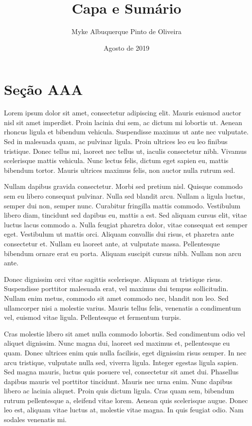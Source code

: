 \documentclass{article}
\begin{document}
	\title{\textbf{{\Huge Capa e Sumário}}}
	\author{Myke Albuquerque Pinto de Oliveira}
	\date{Agosto de 2019}
	
	\maketitle
	\thispagestyle{empty}
	\newpage
	
	\setcounter{page}{1}
	\tableofcontents
	\newpage
	
	\setcounter{page}{1}
	\section{Seção AAA}
	Lorem ipsum dolor sit amet, consectetur adipiscing elit. Mauris euismod auctor nisl sit amet imperdiet. Proin lacinia dui sem, ac dictum mi lobortis ut. Aenean rhoncus ligula et bibendum vehicula. Suspendisse maximus ut ante nec vulputate. Sed in malesuada quam, ac pulvinar ligula. Proin ultrices leo eu leo finibus tristique. Donec tellus mi, laoreet nec tellus ut, iaculis consectetur nibh. Vivamus scelerisque mattis vehicula. Nunc lectus felis, dictum eget sapien eu, mattis bibendum tortor. Mauris ultrices maximus felis, non auctor nulla rutrum sed.
	
	Nullam dapibus gravida consectetur. Morbi sed pretium nisl. Quisque commodo sem eu libero consequat pulvinar. Nulla sed blandit arcu. Nullam a ligula luctus, semper dui non, semper nunc. Curabitur fringilla mattis commodo. Vestibulum libero diam, tincidunt sed dapibus eu, mattis a est. Sed aliquam cursus elit, vitae luctus lacus commodo a. Nulla feugiat pharetra dolor, vitae consequat est semper eget. Vestibulum ut mattis orci. Aliquam convallis dui risus, et pharetra ante consectetur et. Nullam eu laoreet ante, at vulputate massa. Pellentesque bibendum ornare erat eu porta. Aliquam suscipit cursus nibh. Nullam non arcu ante.
	
	Donec dignissim orci vitae sagittis scelerisque. Aliquam at tristique risus. Suspendisse porttitor malesuada erat, vel maximus dui tempus sollicitudin. Nullam enim metus, commodo sit amet commodo nec, blandit non leo. Sed ullamcorper nisi a molestie varius. Mauris tellus felis, venenatis a condimentum vel, euismod vitae ligula. Pellentesque et fermentum turpis.
	
	Cras molestie libero sit amet nulla commodo lobortis. Sed condimentum odio vel aliquet dignissim. Nunc magna dui, laoreet sed maximus et, pellentesque eu quam. Donec ultrices enim quis nulla facilisis, eget dignissim risus semper. In nec arcu tristique, vulputate nulla sed, viverra ligula. Integer egestas ligula sapien. Sed magna mauris, luctus quis posuere vel, consectetur sit amet dui. Phasellus dapibus mauris vel porttitor tincidunt. Mauris nec urna enim. Nunc dapibus libero ac lacinia aliquet. Proin quis dictum ligula. Cras quam sem, bibendum rutrum pellentesque a, eleifend vitae lorem. Aenean quis scelerisque augue. Donec leo est, aliquam vitae luctus at, molestie vitae magna. In quis feugiat odio. Nam sodales venenatis mi.
	
\end{document}

